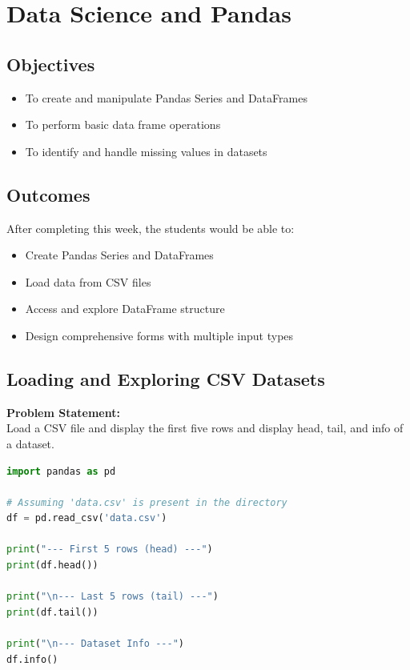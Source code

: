 \documentclass[a4paper,12pt]{article}
\begin{document}
\section{Data Science and Pandas}

\subsection*{Objectives}
\begin{itemize}
    \item To create and manipulate Pandas Series and DataFrames
    \item To perform basic data frame operations
    \item To identify and handle missing values in datasets
\end{itemize}

\subsection*{Outcomes}
After completing this week, the students would be able to:
\begin{itemize}
    \item Create Pandas Series and DataFrames
    \item Load data from CSV files
    \item Access and explore DataFrame structure
    \item Design comprehensive forms with multiple input types
\end{itemize}

\subsection{Loading and Exploring CSV Datasets}
\textbf{Problem Statement:} \\
Load a CSV file and display the first five rows and display head, tail, and info of a dataset.

\begin{lstlisting}[language=Python, caption={Load and explore a CSV file}]
import pandas as pd

# Assuming 'data.csv' is present in the directory
df = pd.read_csv('data.csv')

print("--- First 5 rows (head) ---")
print(df.head())

print("\n--- Last 5 rows (tail) ---")
print(df.tail())

print("\n--- Dataset Info ---")
df.info()
\end{lstlisting}
\end{document}
